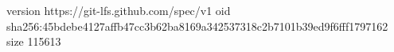 version https://git-lfs.github.com/spec/v1
oid sha256:45bdebe4127affb47cc3b62ba8169a342537318c2b7101b39ed9f6fff1797162
size 115613

